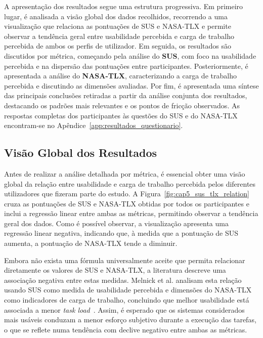 A apresentação dos resultados segue uma estrutura progressiva. Em primeiro lugar, é analisada a visão global dos dados recolhidos, recorrendo a uma visualização que relaciona as pontuações de SUS e NASA-TLX e permite observar a tendência geral entre usabilidade percebida e carga de trabalho percebida de ambos os perfis de utilizador. Em seguida, os resultados são discutidos por métrica, começando pela análise do \textbf{SUS}, com foco na usabilidade percebida e na dispersão das pontuações entre participantes. Posteriormente, é apresentada a análise do \textbf{NASA-TLX}, caracterizando a carga de trabalho percebida e discutindo as dimensões avaliadas. Por fim, é apresentada uma síntese das principais conclusões retiradas a partir da análise conjunta dos resultados, destacando os padrões mais relevantes e os pontos de fricção observados. As respostas completas dos participantes às questões do SUS e do NASA-TLX encontram-se no Apêndice~\ref{app:resultados_questionario}.

\subsection{Visão Global dos Resultados}
\label{subsec:cap5_results_global}

Antes de realizar a análise detalhada por métrica, é essencial obter uma visão global da relação entre usabilidade e carga de trabalho percebida pelos diferentes utilizadores que fizeram parte do estudo. A Figura~\ref{fig:cap5_sus_tlx_relation} cruza as pontuações de SUS e NASA-TLX obtidas por todos os participantes e inclui a regressão linear entre ambas as métricas, permitindo observar a tendência geral dos dados. Como é possível observar, a visualização apresenta uma regressão linear negativa, indicando que, à medida que a pontuação de SUS aumenta, a pontuação de NASA-TLX tende a diminuir.

Embora não exista uma fórmula universalmente aceite que permita relacionar diretamente os valores de SUS e NASA-TLX, a literatura descreve uma associação negativa entre estas medidas. Melnick et al. analisam esta relação usando SUS como medida de usabilidade percebida e dimensões do NASA-TLX como indicadores de carga de trabalho, concluindo que melhor usabilidade está associada a menor \textit{task load}~\cite{melnick2020perceived}. Assim, é esperado que os sistemas considerados mais usáveis conduzam a menor esforço subjetivo durante a execução das tarefas, o que se reflete numa tendência com declive negativo entre ambas as métricas.

